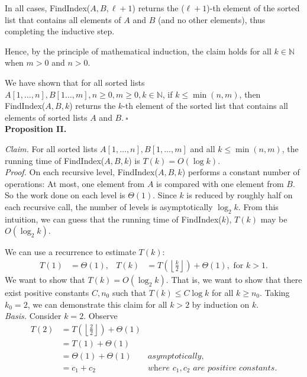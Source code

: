 \begin{solution}
\begin{itemize}
In all cases, {\sc FindIndex}($A,B,\ell+1$) returns the ($\ell+1$)-th element of the sorted list that contains all elements of $A$ and $B$ (and no other elements), thus completing the inductive step.

Hence, by the principle of mathematical induction, the claim holds for all $k\in\mathbb{N}$ when $m>0$ and $n>0$.
\end{itemize}

\noindent We have shown that for all sorted lists $A[1,\dots,n],B[1\dots,m],n\geq 0,m\geq 0,k\in\mathbb{N}$, if $k\leq\min(n,m)$, then {\sc FindIndex}($A,B,k$) returns the $k$-th element of the sorted list that contains all elements of sorted lists $A$ and $B$.$~\square$\\

\noindent\textbf{Proposition II.}

\noindent\textit{Claim. }For all sorted lists $A[1,\dots,n],B[1,\dots,m]$ and all $k\leq\min(n,m)$, the running time of {\sc FindIndex}($A,B,k$) is $T(k)=O(\log{k})$.\\

\noindent\textit{Proof. }On each recursive level, {\sc FindIndex}($A,B,k$) performs a constant number of operations: At most, one element from $A$ is compared with one element from $B$. So the work done on each level is $\Theta(1)$. Since $k$ is reduced by roughly half on each recursive call, the number of levels is asymptotically $\log_2k$. From this intuition, we can guess that the running time of {\sc FindIndex}($k$), $T(k)$ may be $O(\log_2k)$. 

We can use a recurrence to estimate $T(k)$:
\begin{align*}
T(1)&=\Theta(1),&
T(k)&=T\left(\left\lfloor\frac{k}{2}\right\rfloor\right)+\Theta(1),
\text{ for }k>1.
\end{align*}
We want to show that $T(k)=O(\log_2k)$. That is, we want to show that there exist positive constants $C,n_0$ such that $T(k)\leq C\log{k}$ for all $k\geq n_0$. Taking $k_0=2$, we can demonstrate this claim for all $k>2$ by induction on $k$.\\

\noindent\textit{Basis. }Consider $k=2$. Observe
\begin{align*}
T(2)&=T\left(\left\lfloor\frac{2}{2}\right\rfloor\right)+\Theta(1)\\
&=T(1)+\Theta(1)\\
&=\Theta(1)+\Theta(1)&\textit{asymptotically,}\\
&=c_1+c_2&\textit{where $c_1,c_2$ are positive constants.}
\end{align*}


\end{solution}
